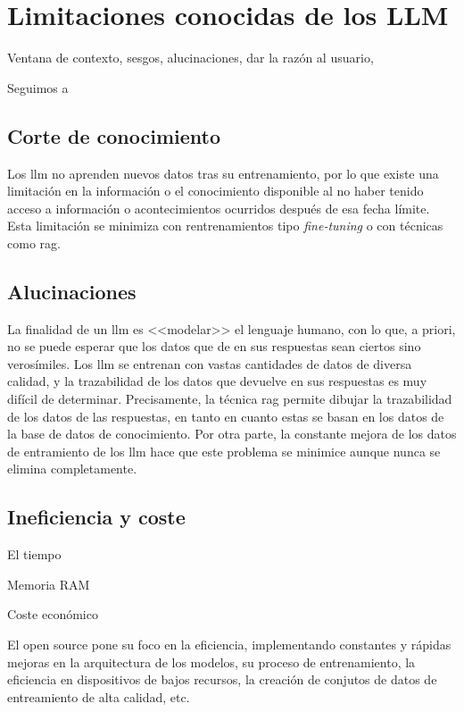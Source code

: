 \section{Limitaciones conocidas de los LLM}
\label{sec:limitaciones_llm}
Ventana de contexto, sesgos, alucinaciones, dar la razón al usuario, 

Seguimos a \cite{arunbijiRAGVsFinetuning}



\subsection{Corte de conocimiento}

Los \gls{llm} no aprenden nuevos datos tras su entrenamiento, por lo que existe una limitación en la información o el conocimiento disponible al no haber tenido acceso a información o acontecimientos ocurridos después de esa fecha límite. Esta limitación se minimiza con rentrenamientos tipo \textit{fine-tuning} o con técnicas como \gls{rag}.

\subsection{Alucinaciones}

La finalidad de un \gls{llm} es <<modelar>> el lenguaje humano, con lo que, a priori, no se puede esperar que los datos que de en sus respuestas sean ciertos sino verosímiles. Los \gls{llm} se entrenan con vastas cantidades de datos de diversa calidad, y la trazabilidad de los datos que devuelve en sus respuestas es muy difícil de determinar. Precisamente, la técnica \gls{rag} permite dibujar la trazabilidad de los datos de las respuestas, en tanto en cuanto estas se basan en los datos de la base de datos de conocimiento. Por otra parte, la constante mejora de los datos de entramiento de los \gls{llm} \citep{gunasekarTextbooksAreAll2023} hace que este problema se minimice aunque nunca se elimina completamente.

\subsection{Ineficiencia y coste}

El tiempo

Memoria RAM

Coste económico


El open source pone su foco en la eficiencia, implementando constantes y rápidas mejoras en la arquitectura de los modelos, su proceso de entrenamiento, la eficiencia en dispositivos de bajos recursos, la creación de conjutos de datos de entreamiento de alta calidad, etc.

